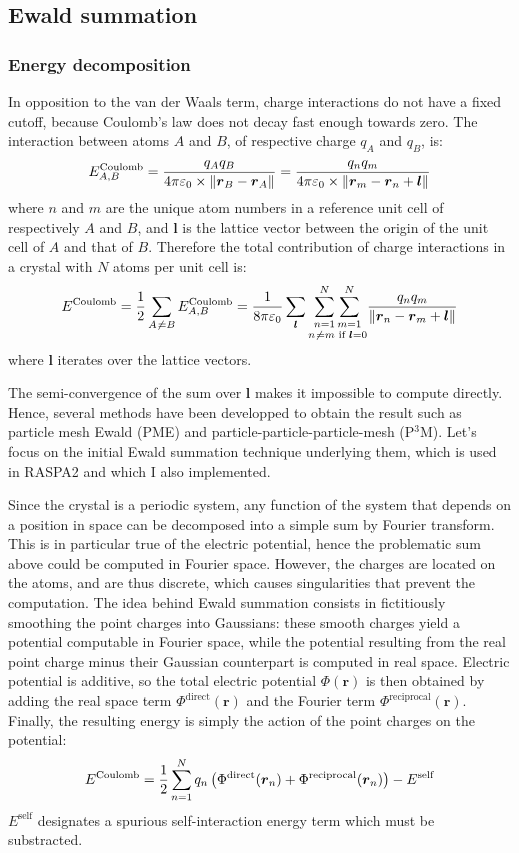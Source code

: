 \documentclass[main.tex]{subfiles}
\begin{document}
\subsection{Ewald summation}

\subsubsection{Energy decomposition}

In opposition to the van der Waals term, charge interactions do not have a fixed cutoff, because Coulomb's law does not decay fast enough towards zero. The interaction between atoms $A$ and $B$, of respective charge $q_A$ and $q_B$, is:
\[E^\text{Coulomb}_{A,B} = \frac{q_A q_B}{4\pi\varepsilon_0\times \left\|\boldsymbol r_B - \boldsymbol r_A\right\|} = \frac{q_n q_m}{4\pi\varepsilon_0\times \left\|\boldsymbol r_m - \boldsymbol r_n + \boldsymbol l\right\|}\]
where $n$ and $m$ are the unique atom numbers in a reference unit cell of respectively $A$ and $B$, and $\boldsymbol l$ is the lattice vector between the origin of the unit cell of $A$ and that of $B$.
Therefore the total contribution of charge interactions in a crystal with $N$ atoms per unit cell is:
\[E^\text{Coulomb} = \frac12\sum_{A\not\kern0.2ex= B}E^\text{Coulomb}_{A,B}
                   = \frac1{8\pi\varepsilon_0}\sum_{\boldsymbol l}\underset{n\not\kern0.2ex= m\text{ if }\boldsymbol l = 0}{\sum_{n=1}^N\sum_{m=1}^N} \frac{q_n q_m}{\left\|\boldsymbol r_n - \boldsymbol r_m + \boldsymbol l\right\|}\]
where $\boldsymbol l$ iterates over the lattice vectors.

The semi-convergence of the sum over $\boldsymbol l$ makes it impossible to compute directly. Hence, several methods have been developped to obtain the result such as particle mesh Ewald (PME) and particle-particle-particle-mesh (P$^3$M). Let's focus on the initial Ewald summation technique underlying them, which is used in RASPA2 and which I also implemented.

Since the crystal is a periodic system, any function of the system that depends on a position in space can be decomposed into a simple sum by Fourier transform. This is in particular true of the electric potential, hence the problematic sum above could be computed in Fourier space. However, the charges are located on the atoms, and are thus discrete, which causes singularities that prevent the computation. The idea behind Ewald summation consists in fictitiously smoothing the point charges into Gaussians: these smooth charges yield a potential computable in Fourier space, while the potential resulting from the real point charge minus their Gaussian counterpart is computed in real space. Electric potential is additive, so the total electric potential $\Phi(\boldsymbol r)$ is then obtained by adding the real space term $\Phi^\text{direct}(\boldsymbol r)$ and the Fourier term $\Phi^\text{reciprocal}(\boldsymbol r)$. Finally, the resulting energy is simply the action of the point charges on the potential:
\[E^\text{Coulomb} = \frac12\sum_{n=1}^N q_n\left(\Phi^\text{direct}(\boldsymbol r_n) + \Phi^\text{reciprocal}(\boldsymbol r_n)\right) - E^{\text{self}}\]
$E^{\text{self}}$ designates a spurious self-interaction energy term which must be substracted.
\end{document}
